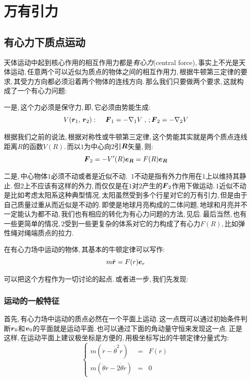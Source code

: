 \chapter{万有引力}


\section{有心力下质点运动}

天体运动中起到核心作用的相互作用力都是\emph{有心力}(central force),\,事实上不光是天体运动,\,任意两个可以近似为质点的物体之间的相互作用力,\,根据牛顿第三定律的要求,\,其受力方向都必须沿着两个物体的连线方向.\,那么我们只要做两个要求,\,这就构成了一个有心力问题:

一是,\,这个力必须是保守力,\,即,\,它必须由势能生成:
\[V(\boldsymbol{r}_1,\,\boldsymbol{r}_2):\quad\,\boldsymbol{F}_1=-\nabla_1V\;,\,; \boldsymbol{F}_2=-\nabla_2V\]

根据我们之前的说法,\,根据对称性或牛顿第三定律,\,这个势能其实就是两个质点连线距离$R$的函数$V(R)$.\,而以$1$为中心向$2$引$\boldsymbol{R}$矢量,\,则:
\[\boldsymbol{F}_2=-V'(R)\boldsymbol{e}_{\boldsymbol{R}}=F(R)\boldsymbol{e}_{\boldsymbol{R}}\]

二是,\,中心物体$1$必须不动或者是近似不动.\, $1$不动是指有外力作用在$1$上以维持其静止.\,但$2$上不应该有这样的外力,\,而仅仅是在$1$对$2$产生的$\boldsymbol{F}_2$作用下做运动.\,$1$近似不动是比如考虑太阳系这种典型情况,\,太阳虽然受到多个行星对它的万有引力,\,但是由于自己质量过重从而近似是不动的.\,即使是地球月亮构成的二体问题,\,地球和月亮并不一定能认为都不动,\,我们也有相应的转化为有心力问题的方法,\,见后.\,最后当然,\,也有一些更简单的情况,\,$2$受到一些更复杂的体系对它的力构成了有心力$F(R)$,\,比如弹性绳对绳端质点的拉力.

在有心力场中运动的物体,\,其基本的牛顿定律可以写作:
\[m\ddot{\boldsymbol{r}}=F(r)\boldsymbol{e}_r\]

可以把这个方程作为一切讨论的起点.\,或者进一步,\,我们先发现:

\subsection{运动的一般特征}

首先,\,有心力场中运动的质点必然在一个平面上运动.\,这一点既可以通过初始条件判断$\boldsymbol{r}_0$和$\boldsymbol{v}_0$的平面就是运动平面.\,也可以通过下面的角动量守恒来发现这一点.\,正是这样,\,在运动平面上建议极坐标是方便的,\,用极坐标写出的牛顿定律分量式为:
\[\left\{\begin{array}{rcl} m(\ddot{r}-\dot{\theta}^2r) &=& F(r)\\ m(\ddot{\theta} r-2\dot{\theta}\dot{r})&=& 0\end{array}\right.\]

